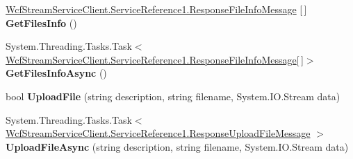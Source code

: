 \begin{DoxyCompactItemize}
\item 
\mbox{\label{class_wcf_stream_service_client_1_1_service_reference1_1_1_strumien_client_aff1a9bfb0ded8ee347546ba4127240dd}} 
\hyperlink{class_wcf_stream_service_client_1_1_service_reference1_1_1_response_file_info_message}{Wcf\+Stream\+Service\+Client.\+Service\+Reference1.\+Response\+File\+Info\+Message} \mbox{[}$\,$\mbox{]} {\bfseries Get\+Files\+Info} ()
\item 
\mbox{\label{class_wcf_stream_service_client_1_1_service_reference1_1_1_strumien_client_a2e2840da57ac9b67aa36b3d107507eda}} 
System.\+Threading.\+Tasks.\+Task$<$ \hyperlink{class_wcf_stream_service_client_1_1_service_reference1_1_1_response_file_info_message}{Wcf\+Stream\+Service\+Client.\+Service\+Reference1.\+Response\+File\+Info\+Message}\mbox{[}$\,$\mbox{]}$>$ {\bfseries Get\+Files\+Info\+Async} ()
\item 
\mbox{\label{class_wcf_stream_service_client_1_1_service_reference1_1_1_strumien_client_a5981fd50bf36deb02e2c8e9479909fbe}} 
bool {\bfseries Upload\+File} (string description, string filename, System.\+I\+O.\+Stream data)
\item 
\mbox{\label{class_wcf_stream_service_client_1_1_service_reference1_1_1_strumien_client_abecb1915d81995800855298ba9912baf}} 
System.\+Threading.\+Tasks.\+Task$<$ \hyperlink{class_wcf_stream_service_client_1_1_service_reference1_1_1_response_upload_file_message}{Wcf\+Stream\+Service\+Client.\+Service\+Reference1.\+Response\+Upload\+File\+Message} $>$ {\bfseries Upload\+File\+Async} (string description, string filename, System.\+I\+O.\+Stream data)
\end{DoxyCompactItemize}
